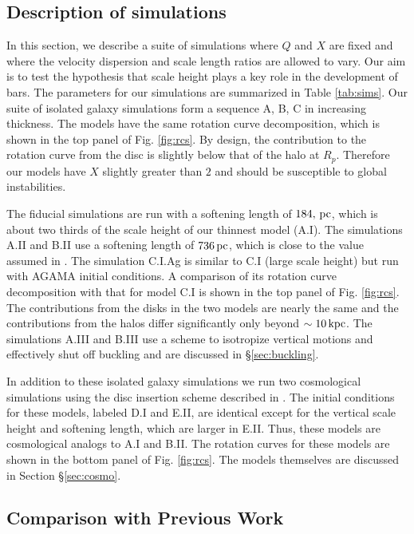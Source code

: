 \subsection{Description of simulations}

In this section, we describe a suite of simulations where $Q$ and $X$
are fixed and where the velocity dispersion and scale length
ratios are allowed to vary.  Our aim is to test the hypothesis that scale
height plays a key role in the development of bars.  The parameters
for our simulations are summarized in Table \ref{tab:sims}.  Our suite
of isolated galaxy simulations form a sequence A, B, C in increasing
thickness.  The models have the same rotation curve decomposition,
which is shown in the top panel of Fig. \ref{fig:rcs}.  By design, the
contribution to the rotation curve from the disc is slightly below
that of the halo at $R_p$.  Therefore our models have $X$ slightly
greater than $2$ and should be susceptible to global instabilities.

The fiducial simulations are run with a softening length of
$184,\,{\rm pc}$, which is about two thirds of the scale height of our
thinnest model (A.I).  The simulations A.II and B.II use a softening
length of $736\,{\rm pc}$, which is close to the value assumed in
\citet{YurinSpringelStellarDisks}.  The simulation C.I.Ag is similar
to C.I (large scale height) but run with \textsc{AGAMA} initial
conditions.  A comparison of its rotation curve decomposition with
that for model C.I is shown in the top panel of Fig. \ref{fig:rcs}.
The contributions from the disks in the two models are nearly the same
and the contributions from the halos differ significantly only beyond
$\sim 10\,{\rm kpc}$.  The simulations A.III and B.III use a scheme to
isotropize vertical motions and effectively shut off buckling and are
discussed in \S \ref{sec:buckling}.

In addition to these isolated galaxy simulations we run two
cosmological simulations using the disc insertion scheme described in
\citet{Bauer2018a}.  The initial conditions for these models, labeled
D.I and E.II, are identical except for the vertical scale height and
softening length, which are larger in E.II.  Thus, these models are
cosmological analogs to A.I and B.II.  The rotation curves for these
models are shown in the bottom panel of Fig. \ref{fig:rcs}.  The
models themselves are discussed in Section \S \ref{sec:cosmo}.

\subsection{Comparison with Previous Work}

